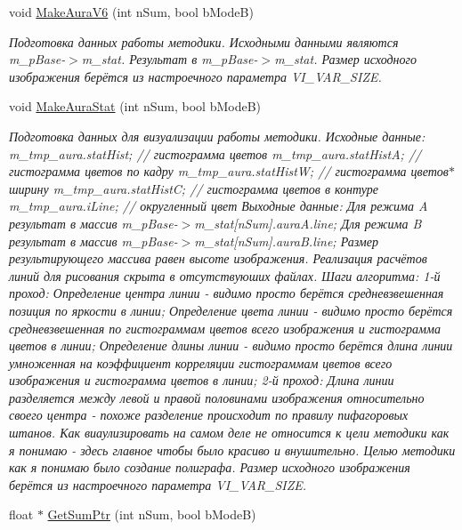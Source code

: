 \begin{DoxyCompactItemize}
void \hyperlink{class_c_v_i_engine_thread_a138c31012cd6924325231acdd4fbba49}{Make\+Aura\+V6} (int n\+Sum, bool b\+Mode\+B)
\begin{DoxyCompactList}\small\item\em Подготовка данных работы методики. Исходными данными являются m\+\_\+p\+Base-\/$>$m\+\_\+stat. Результат в m\+\_\+p\+Base-\/$>$m\+\_\+stat. Размер исходного изображения берётся из настроечного параметра V\+I\+\_\+\+V\+A\+R\+\_\+\+S\+I\+Z\+E. \end{DoxyCompactList}\item 
void \hyperlink{class_c_v_i_engine_thread_a6194597cfb410aaa4a3b291f9dbe13cd}{Make\+Aura\+Stat} (int n\+Sum, bool b\+Mode\+B)
\begin{DoxyCompactList}\small\item\em Подготовка данных для визуализации работы методики. Исходные данные\+: m\+\_\+tmp\+\_\+aura.\+stat\+Hist; // гистограмма цветов m\+\_\+tmp\+\_\+aura.\+stat\+Hist\+A; // гистограмма цветов по кадру m\+\_\+tmp\+\_\+aura.\+stat\+Hist\+W; // гистограмма цветов$\ast$ширину m\+\_\+tmp\+\_\+aura.\+stat\+Hist\+C; // гистограмма цветов в контуре m\+\_\+tmp\+\_\+aura.\+i\+Line; // округленный цвет Выходные данные\+: Для режима A результат в массив m\+\_\+p\+Base-\/$>$m\+\_\+stat\mbox{[}n\+Sum\mbox{]}.aura\+A.\+line; Для режима B результат в массив m\+\_\+p\+Base-\/$>$m\+\_\+stat\mbox{[}n\+Sum\mbox{]}.aura\+B.\+line; Размер результирующего массива равен высоте изображения. Реализация расчётов линий для рисования скрыта в отсутствуюших файлах. Шаги алгоритма\+: 1-\/й проход\+: Определение центра линии -\/ видимо просто берётся средневзвешенная позиция по яркости в линии; Определение цвета линии -\/ видимо просто берётся средневзвешенная по гистограммам цветов всего изображения и гистограмма цветов в линии; Определение длины линии -\/ видимо просто берётся длина линии умноженная на коэффициент корреляции гистограммам цветов всего изображения и гистограмма цветов в линии; 2-\/й проход\+: Длина линии разделяется между левой и правой половинами изображения относительно своего центра -\/ похоже разделение происходит по правилу пифагоровых штанов. Как виаулизировать на самом деле не относится к цели методики как я понимаю -\/ здесь главное чтобы было красиво и внушительно. Целью методики как я понимаю было создание полиграфа. Размер исходного изображения берётся из настроечного параметра V\+I\+\_\+\+V\+A\+R\+\_\+\+S\+I\+Z\+E. \end{DoxyCompactList}\item 
float $\ast$ \hyperlink{class_c_v_i_engine_thread_a157eaab33c9c5c2a157b458a4a0eb1f4}{Get\+Sum\+Ptr} (int n\+Sum, bool b\+Mode\+B)

\end{DoxyCompactItemize}
